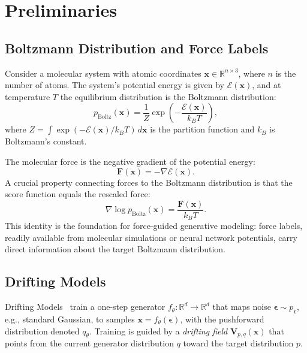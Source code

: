 \documentclass[11pt]{article}
\newcommand{\bx}{\mathbf{x}}
\newcommand{\bV}{\mathbf{V}}
\newcommand{\bF}{\mathbf{F}}
\newcommand{\beps}{\boldsymbol{\epsilon}}
\newcommand{\R}{\mathbb{R}}
\newcommand{\pboltz}{p_{\text{Boltz}}}
\newcommand{\kBT}{k_BT}
\begin{document}
\section{Preliminaries}
\label{sec:prelim}

\subsection{Boltzmann Distribution and Force Labels}
\label{sec:boltzmann}

Consider a molecular system with atomic coordinates $\bx \in \R^{n \times 3}$, where $n$ is the number of atoms.
The system's potential energy is given by $\mathcal{E}(\bx)$, and at temperature $T$ the equilibrium distribution is the Boltzmann distribution:
\begin{equation}
    \pboltz(\bx) = \frac{1}{Z}\exp\!\left(-\frac{\mathcal{E}(\bx)}{\kBT}\right),
    \label{eq:boltzmann}
\end{equation}
where $Z = \int \exp(-\mathcal{E}(\bx)/\kBT)\,d\bx$ is the partition function and $k_B$ is Boltzmann's constant.

The molecular force is the negative gradient of the potential energy:
\begin{equation}
    \bF(\bx) = -\nabla\mathcal{E}(\bx).
    \label{eq:force}
\end{equation}
A crucial property connecting forces to the Boltzmann distribution is that the score function equals the rescaled force:
\begin{equation}
    \nabla \log \pboltz(\bx) = \frac{\bF(\bx)}{\kBT}.
    \label{eq:score-force}
\end{equation}
This identity is the foundation for force-guided generative modeling: force labels, readily available from molecular simulations or neural network potentials, carry direct information about the target Boltzmann distribution.

\subsection{Drifting Models}
\label{sec:drifting}

Drifting Models~\citep{deng2026drifting} train a one-step generator $f_\theta\colon \R^d \to \R^d$ that maps noise $\beps \sim p_{\beps}$, e.g., standard Gaussian, to samples $\bx = f_\theta(\beps)$, with the pushforward distribution denoted $q_\theta$.
Training is guided by a \emph{drifting field} $\bV_{p,q}(\bx)$ that points from the current generator distribution $q$ toward the target distribution $p$.
\end{document}
